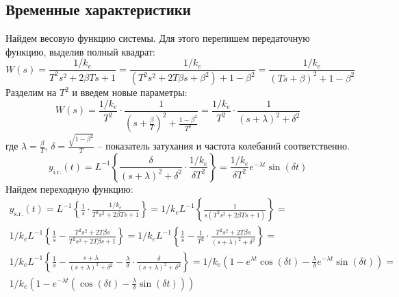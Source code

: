 \subsection{Временные характеристики}
\noindent Найдем весовую функцию системы. Для этого перепишем передаточную функцию, выделив полный квадрат: 
\begin{equation}
    W(s) = \frac{1/k_e}{T^2s^2 + 2\beta Ts + 1} = \frac{1/k_e}{(T^2s^2 + 2T\beta s + \beta^2) + 1 - \beta^2} = \frac{1/k_e}{(Ts + \beta)^2 + 1 - \beta^2} 
\end{equation}
Разделим на $T^2$ и введем новые параметры: 
\begin{equation}
    W(s) = \frac{1/k_e}{T^2}\cdot\frac{1}{(s + \frac{\beta}{T})^2 + \frac{1 - \beta^2}{T^2}} = \frac{1/k_e}{T^2}\cdot\frac{1}{(s + \lambda)^2 + \delta^2}
\end{equation}
где $\lambda = \frac{\beta}{T}$, $\delta = \frac{\sqrt{1 - \beta^2}}{T}$ -- показатель затухания и частота колебаний соответственно.
\begin{equation}
    y_{\text{i.r.}}(t) = L^{-1}\left\{\frac{\delta}{(s + \lambda)^2 + \delta^2}\cdot\frac{1/k_e}{\delta T^2}\right\} = \frac{1/k_e}{\delta T^2}e^{-\lambda t}\sin(\delta t)
\end{equation}
Найдем переходную функцию:
\begin{multline}
    y_{\text{s.r.}}(t) = L^{-1}\left\{ \frac{1}{s}\cdot\frac{1/k_e}{T^2s^2 + 2\beta Ts + 1} \right\} = 1/k_eL^{-1}\left\{ \frac{1}{s(T^2s^2 + 2\beta Ts + 1)} \right\} =  \\
    1/k_eL^{-1}\left\{ \frac{1}{s} - \frac{T^2s^2 +2T\beta s}{T^2s^2 +2T\beta s + 1} \right\} = 1/k_eL^{-1}\left\{ \frac{1}{s} - \frac{1}{T^2}\cdot\frac{T^2s^2 +2T\beta s}{(s + \lambda)^2+\delta^2} \right\} = \\
    1/k_e L^{-1} \left\{ \frac{1}{s} - \frac{s + \lambda}{(s + \lambda)^2 + \delta^2} -\frac{\lambda}{\delta} \cdot \frac{\delta}{(s + \lambda)^2 + \delta^2} \right\} = 1/k_e(1 - e^{\lambda t}\cos(\delta t) - \frac{\lambda}{\delta} e^{-\lambda t} \sin(\delta t)) = \\
    1/k_e(1 - e^{-\lambda t}(\cos(\delta t) -\frac{\lambda}{\delta}\sin(\delta t)))
\end{multline}


